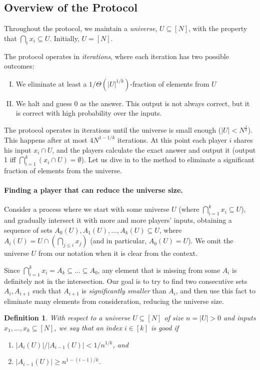 \documentclass{article}
\theoremstyle{plain}
\newtheorem{definition}{Definition}
\begin{document}
\subsection{Overview of the Protocol}
Throughout the protocol, we maintain a \emph{universe}, $U \subseteq [N]$,
with the property that $\bigcap_i x_i \subseteq U$.
Initially, $U = [N]$.

The protocol operates in \emph{iterations}, where each iteration has two possible outcomes:
\begin{enumerate}[I.]
  \item We eliminate at least a $1/\Theta(|U|^{1/k})$-fraction of elements from $U$
  \item We halt and guess 0 as the answer. This output is not always correct, but it is correct with high probability over the inputs.
\end{enumerate}
The protocol operates in iterations until the universe is small enough ($|U| < N^{\frac{1}{k}}$). This happens after at most $4N^{1 - 1/k}$ iterations. At this point each player $i$ shares his input $x_i \cap U$,
and the players calculate the exact answer and output it (output 1 iff $\bigcap_{i = 1}^k (x_i \cap U) = \emptyset$). \newline
\newline
Let us dive in to the method to eliminate a significant fraction of elements from the universe.

\paragraph{Finding a player that can reduce the universe size.}
Consider a process where we start with some universe $U$ (where $\bigcap_{i = 1}^k x_i \subseteq U$),
and gradually intersect it with more and more players' inputs, 
obtaining a sequence of sets $A_0(U), A_1(U),\ldots,A_k(U) \subseteq U$,
where $A_i(U) = U \cap (\bigcap_{j \leq i} x_j)$ (and in particular, $A_0(U) = U$).
We omit the universe $U$ from our notation when it is clear from the context.

Since $\bigcap_{i = 1}^k x_i = A_k \subseteq \ldots \subseteq A_0$,
any element that is missing from some $A_i$ is definitely not in the intersection.
Our goal is to try to find two consecutive sets $A_i, A_{i+1}$ such that $A_{i+1}$ is \emph{significantly smaller} than $A_i$,
and then use this fact to eliminate many elements from consideration, reducing the universe size.

\begin{definition}
  With respect to a universe $U \subseteq [N]$ of size $n = |U| > 0$ and inputs $x_1,\ldots,x_k \subseteq [N]$,
  we say that an index $i \in [k]$ is \emph{good} if
  \begin{enumerate}
    \item $|A_i(U)| / |A_{i-1}(U)| < 1/n^{1/k}$, and
    \item $|A_{i-1}(U)| \geq n^{1-(i-1)/k}$.
  \end{enumerate}
  \label{def:good}
\end{definition}
\end{document}
